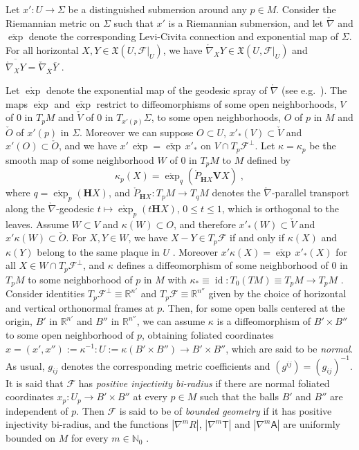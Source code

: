 \documentclass{memo-l}
\theoremstyle{plain}
\theoremstyle{definition}
\theoremstyle{remark}
\newcommand{\N}{\mathbb{N}}
\newcommand{\R}{\mathbb{R}}
\newcommand{\FF}{\mathcal{F}}
\newcommand{\fX}{\mathfrak{X}}
\newcommand{\bfH}{\boldsymbol{H}}
\newcommand{\bfV}{\boldsymbol{V}}
\newcommand{\sA}{\mathsf{A}}
\newcommand{\sT}{\mathsf{T}}
\newcommand{\id}{\operatorname{id}}
\newcommand{\rnabla}{\mathring{\nabla}}
\newcommand{\rP}{\mathring{P}}
\newcommand{\rexp}{\mathring{\exp}}
\newcommand{\cnabla}{\check{\nabla}}
\newcommand{\cexp}{\check{\exp}}
\newcommand{\cO}{\check{O}}
\newcommand{\cV}{\check{V}}
\numberwithin{section}{chapter}
\numberwithin{equation}{section}%
\begin{document}
Let $x':U\to\Sigma$ be a distinguished submersion around any $p\in M$. Consider the Riemannian metric on $\Sigma$ such that $x'$ is a Riemannian submersion, and let $\cnabla$ and $\cexp$ denote the corresponding Levi-Civita connection and exponential map of $\Sigma$. For all horizontal $X,Y\in\fX(U,\FF|_U)$, we have $\rnabla_XY\in\fX(U,\FF|_U)$ and $\overline{\rnabla_XY}=\cnabla_{\overline X}\overline Y$ \cite[Lemma~1~(3)]{ONeill1966}.

Let $\rexp$\index{$\rexp$} denote the exponential map of the geodesic spray of $\rnabla$ (see e.g.\ \cite[pp.~96--99]{Poor1981}). The maps $\rexp$ and $\cexp$ restrict to diffeomorphisms of some open neighborhoods, $V$ of $0$ in $T_pM$ and $\check V$ of $0$ in $T_{x'(p)}\Sigma$, to some open neighborhoods, $O$ of $p$ in $M$ and $\check O$ of $x'(p)$ in $\Sigma$.  Moreover we can suppose $O\subset U$, $x'_*(V)\subset\check V$ and $x'(O)\subset\check O$, and we have $x'\,\rexp=\cexp\,x'_*$ on $V\cap T_p\FF^\perp$. Let $\kappa=\kappa_p$ be the smooth map of some neighborhood $W$ of $0$ in $T_pM$ to $M$ defined by
$$
\kappa_p(X)=\rexp_q(\rP_{\bfH X}\bfV X)\;,
$$
where $q=\rexp_p(\bfH X)$, and $\rP_{\bfH X}:T_pM\to T_qM$ denotes the $\rnabla$-parallel transport along the $\rnabla$-geodesic $t\mapsto\rexp_p(t\bfH X)$, $0\le t\le1$, which is orthogonal to the leaves. Assume $W\subset V$ and $\kappa(W)\subset O$, and therefore $x'_*(W)\subset\cV$ and $x'\kappa(W)\subset\cO$. For $X,Y\in W$, we have $X-Y\in T_p\FF$ if and only if $\kappa(X)$ and $\kappa(Y)$ belong to the same plaque in $U$ \cite[Proposition~6.1]{AlvKordyLeichtnam2014}. Moreover $x'\kappa(X)=\cexp\,x'_*(X)$ for all $X\in W\cap T_p\FF^\perp$, and $\kappa$ defines a diffeomorphism of some neighborhood of $0$ in $T_pM$ to some neighborhood of $p$ in $M$ with $\kappa_*\equiv\id:T_0(TM)\equiv T_pM\to T_pM$  \cite[Proposition~6.2 and Corollary~6.3]{AlvKordyLeichtnam2014}. Consider identities $T_p\FF^\perp\equiv\R^{n'}$ and $T_p\FF\equiv\R^{n''}$ given by the choice of horizontal and vertical orthonormal frames at $p$. Then, for some open balls centered at the origin, $B'$ in $\R^{n'}$ and $B''$ in $\R^{n''}$, we can assume $\kappa$ is a diffeomorphism of $B'\times B''$ to some open neighborhood of $p$, obtaining foliated coordinates $x=(x',x''):=\kappa^{-1}:U:=\kappa(B'\times B'')\to B'\times B''$, which are said to be \emph{normal}. As usual, $g_{ij}$ denotes the corresponding metric coefficients and $(g^{ij})=(g_{ij})^{-1}$. It is said that $\FF$ has \emph{positive injectivity bi-radius} if there are normal foliated coordinates $x_p:U_p\to B'\times B''$ at every $p\in M$ such that the balls $B'$ and $B''$ are independent of $p$. Then $\FF$ is said to be of \emph{bounded geometry} if it has positive injectivity bi-radius, and the functions $|\nabla^mR|$, $|\nabla^m\sT|$ and $|\nabla^m\sA|$ are uniformly bounded on $M$ for every $m\in\N_0$ \cite[Definition~8.1]{AlvKordyLeichtnam2014}.
\end{document}
